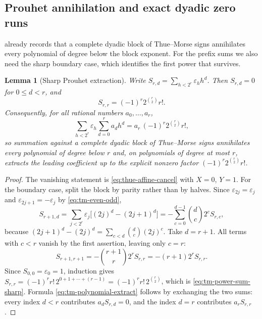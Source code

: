 \documentclass[11pt,oneside]{article}
\newtheorem{lemma}[theorem]{Lemma}
\theoremstyle{definition}
\theoremstyle{remark}
\begin{document}
\subsection{Prouhet annihilation and exact dyadic zero runs}
\label{tm:sub-zero-runs}

 already records that a complete dyadic block of Thue--Morse
signs annihilates every polynomial of degree below the block exponent.  For the prefix sums
we also need the sharp boundary case, which identifies the first power that survives.

\begin{lemma}[Sharp Prouhet extraction]
\label{thm:tm-prouhet-extract}
Write $S_{r,d}=\sum_{h<2^r}\varepsilon_h h^d$.  Then $S_{r,d}=0$ for $0\le d<r$, and
\begin{equation}
 S_{r,r}=(-1)^r2^{\binom r2}r!.                            \label{eq:tm-power-sum-sharp}
\end{equation}
Consequently, for all rational numbers $a_0,\ldots,a_r$,
\begin{equation}
 \sum_{h<2^r}\varepsilon_h\sum_{d=0}^{r}a_dh^d
 =a_r\,(-1)^r2^{\binom r2}r!,                              \label{eq:tm-polynomial-extract}
\end{equation}
so summation against a complete dyadic block of Thue--Morse signs annihilates every
polynomial of degree below $r$ and, on polynomials of degree at most $r$, extracts the
leading coefficient up to the explicit nonzero factor $(-1)^r2^{\binom r2}r!$.
\end{lemma}

\begin{proof}
The vanishing statement is \eqref{eq:thue-affine-cancel} with $X=0$, $Y=1$.  For the
boundary case, split the block by parity rather than by halves.  Since
$\varepsilon_{2j}=\varepsilon_j$ and $\varepsilon_{2j+1}=-\varepsilon_j$ by
\eqref{eq:tm-even-odd},
\begin{equation*}
 S_{r+1,d}
 =\sum_{j<2^r}\varepsilon_j\bigl[(2j)^d-(2j+1)^d\bigr]
 =-\sum_{c=0}^{d-1}\binom dc2^{c}S_{r,c},
\end{equation*}
because $(2j+1)^d-(2j)^d=\sum_{c<d}\binom dc(2j)^c$.  Take $d=r+1$.  All terms with $c<r$
vanish by the first assertion, leaving only $c=r$:
\begin{equation*}
 S_{r+1,r+1}=-\binom{r+1}{r}2^rS_{r,r}=-(r+1)2^rS_{r,r}.
\end{equation*}
Since $S_{0,0}=\varepsilon_0=1$, induction gives
$S_{r,r}=(-1)^rr!\,2^{0+1+\cdots+(r-1)}=(-1)^rr!\,2^{\binom r2}$, which is
\eqref{eq:tm-power-sum-sharp}.  Formula \eqref{eq:tm-polynomial-extract} follows by
exchanging the two sums: every index $d<r$ contributes $a_dS_{r,d}=0$, and the index $d=r$
contributes $a_rS_{r,r}$.
\end{proof}
\end{document}
